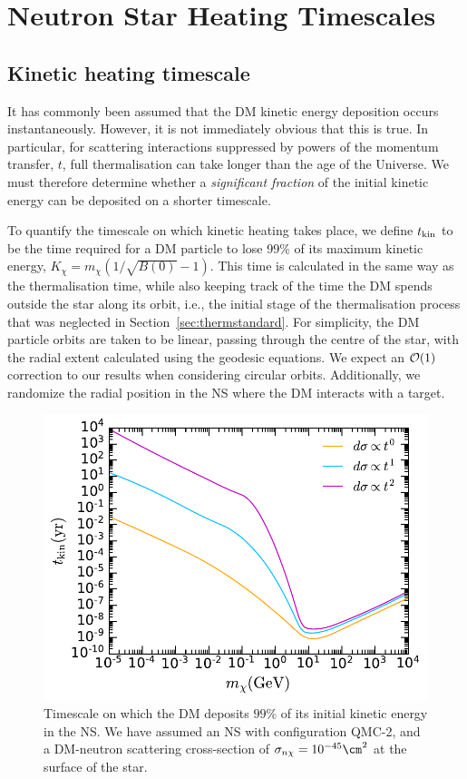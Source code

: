 \section{Neutron Star Heating Timescales}
\label{sec:results}



\subsection{Kinetic heating timescale}
\label{subsec:KinHeating}


It has commonly been assumed that the DM kinetic energy deposition occurs instantaneously. However, it is not immediately obvious that this is true. In particular, for scattering interactions suppressed by powers of the momentum transfer, $t$, full thermalisation can take longer than the age of the Universe. We must therefore determine whether a {\it significant fraction} of the initial kinetic energy can be deposited on a shorter timescale.



To quantify the timescale on which kinetic heating takes place, we define $t_{\rm kin}$ to be the time required for a DM particle to lose 99\% of its maximum kinetic energy, $K_\chi = m_\chi (1/\sqrt{B(0)} - 1)$.  
This time is calculated in the same way as the thermalisation time, while also keeping track of the time the DM spends outside the star along its orbit, i.e., the initial stage of the thermalisation process that was neglected in Section~\ref{sec:thermstandard}. For simplicity, the DM particle orbits are taken to be linear, passing through the centre of the star, with the radial extent calculated using the geodesic equations. We expect an ${\cal O}(1)$ correction to our results when considering circular orbits.
Additionally, we randomize the radial position in the NS where the DM interacts with a target. 

\begin{figure}[t] 
    \centering  \includegraphics[width=.5\textwidth]{kinheattime_mdm.pdf}
    \caption{Timescale on which the DM deposits $99\%$ of its initial kinetic energy in the NS. We have assumed an NS with configuration QMC-2, and a DM-neutron scattering cross-section of $\sigma_{n\chi}=10^{-45}\cm^2$ at the surface of the star. 
    }
    \label{fig:kinheattimes}
\end{figure}

